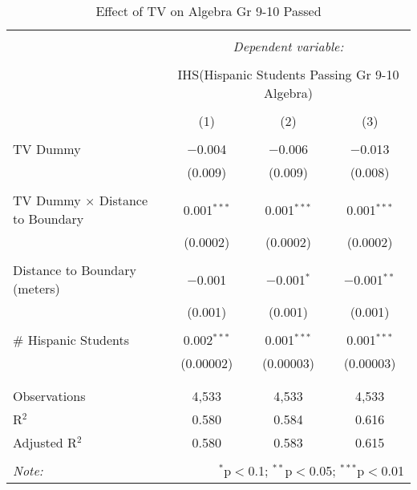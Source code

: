
\begin{table}[!htbp] \centering 
  \caption{Effect of TV on Algebra Gr 9-10 Passed} 
  \label{} 
\begin{tabular}{@{\extracolsep{-2pt}}lccc} 
\\[-1.8ex]\hline 
\hline \\[-1.8ex] 
 & \multicolumn{3}{c}{\textit{Dependent variable:}} \\ 
\cline{2-4} 
\\[-1.8ex] & \multicolumn{3}{c}{IHS(Hispanic Students Passing Gr 9-10 Algebra)} \\ 
\\[-1.8ex] & (1) & (2) & (3)\\ 
\hline \\[-1.8ex] 
 TV Dummy & $-$0.004 & $-$0.006 & $-$0.013 \\ 
  & (0.009) & (0.009) & (0.008) \\ 
  & & & \\ 
 TV Dummy $\times$ Distance to Boundary & 0.001$^{***}$ & 0.001$^{***}$ & 0.001$^{***}$ \\ 
  & (0.0002) & (0.0002) & (0.0002) \\ 
  & & & \\ 
 Distance to Boundary (meters) & $-$0.001 & $-$0.001$^{*}$ & $-$0.001$^{**}$ \\ 
  & (0.001) & (0.001) & (0.001) \\ 
  & & & \\ 
 \# Hispanic Students & 0.002$^{***}$ & 0.001$^{***}$ & 0.001$^{***}$ \\ 
  & (0.00002) & (0.00003) & (0.00003) \\ 
  & & & \\ 
\hline \\[-1.8ex] 
Observations & 4,533 & 4,533 & 4,533 \\ 
R$^{2}$ & 0.580 & 0.584 & 0.616 \\ 
Adjusted R$^{2}$ & 0.580 & 0.583 & 0.615 \\ 
\hline 
\hline \\[-1.8ex] 
\textit{Note:}  & \multicolumn{3}{r}{$^{*}$p$<$0.1; $^{**}$p$<$0.05; $^{***}$p$<$0.01} \\ 
\end{tabular} 
\end{table} 
